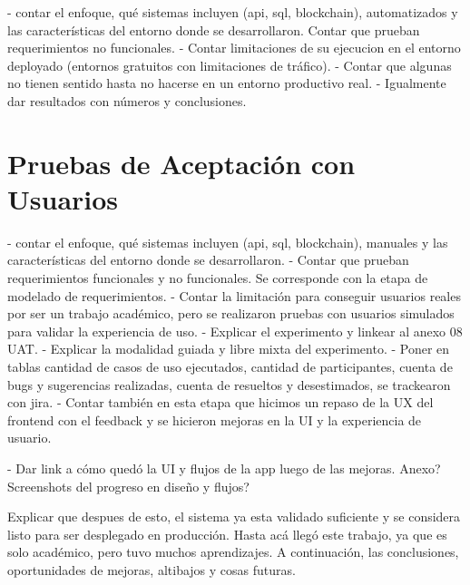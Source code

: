 - contar el enfoque, qué sistemas incluyen (api, sql, blockchain), automatizados y las características del entorno donde se desarrollaron. Contar que prueban requerimientos no funcionales.
- Contar limitaciones de su ejecucion en el entorno deployado (entornos gratuitos con limitaciones de tráfico).
- Contar que algunas no tienen sentido hasta no hacerse en un entorno productivo real.
- Igualmente dar resultados con números y conclusiones.

\section{Pruebas de Aceptación con Usuarios}
\label{sec:user-acceptance-testing}

- contar el enfoque, qué sistemas incluyen (api, sql, blockchain), manuales y las características del entorno donde se desarrollaron. 
- Contar que prueban requerimientos funcionales y no funcionales. Se corresponde con la etapa de modelado de requerimientos.
- Contar la limitación para conseguir usuarios reales por ser un trabajo académico, pero se realizaron pruebas con usuarios simulados para validar la experiencia de uso.
- Explicar el experimento y linkear al anexo 08 UAT.
- Explicar la modalidad guiada y libre mixta del experimento.
- Poner en tablas cantidad de casos de uso ejecutados, cantidad de participantes, cuenta de bugs y sugerencias realizadas, cuenta de resueltos y desestimados, se trackearon con jira.
- Contar también en esta etapa que hicimos un repaso de la UX del frontend con el feedback y se hicieron mejoras en la UI y la experiencia de usuario.

- Dar link a cómo quedó la UI y flujos de la app luego de las mejoras. Anexo? Screenshots del progreso en diseño y flujos?

Explicar que despues de esto, el sistema ya esta validado suficiente y se considera listo para ser desplegado en producción. Hasta acá llegó este trabajo, ya que es solo académico, pero tuvo muchos aprendizajes. A continuación, las conclusiones, oportunidades de mejoras, altibajos y cosas futuras.
